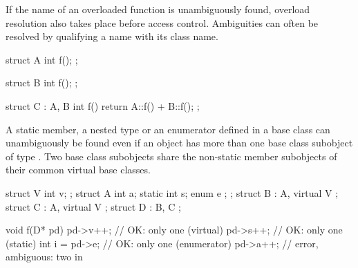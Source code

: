 \pnum
{}%
If the name of an overloaded function is unambiguously found,
overload resolution also takes place before access
control.
%
Ambiguities can often be resolved by qualifying a name with its class name.
\begin{example}
\begin{codeblock}
struct A {
  int f();
};

\end{codeblock}
\begin{codeblock}
struct B {
  int f();
};

\end{codeblock}
\begin{codeblock}
struct C : A, B {
  int f() { return A::f() + B::f(); }
};
\end{codeblock}
\end{example}

\pnum
\begin{note}
A static member, a nested type or an enumerator defined in a base class
 can unambiguously be found even if an object has more than one
base class subobject of type . Two base class subobjects share
the non-static member subobjects of their common virtual base classes.
\end{note}
\begin{example}
\begin{codeblock}
struct V {
  int v;
};
struct A {
  int a;
  static int   s;
  enum { e };
};
struct B : A, virtual V { };
struct C : A, virtual V { };
struct D : B, C { };

void f(D* pd) {
  pd->v++;          // OK: only one  (virtual)
  pd->s++;          // OK: only one  (static)
  int i = pd->e;    // OK: only one  (enumerator)
  pd->a++;          // error, ambiguous: two  in 
}
\end{codeblock}
\end{example}

